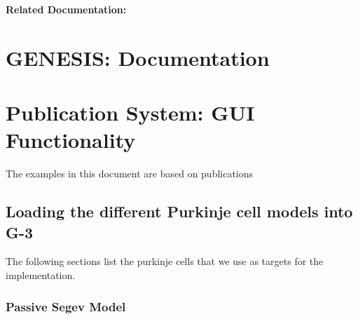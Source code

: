 \documentclass[12pt]{article}
\begin{document}
{\bf Related Documentation:}

\section*{GENESIS: Documentation}

\section{Publication System: GUI Functionality}






The examples in this document are based on publications
\cite{deschutter94:_purkin_i}\cite{deschutter94:_purkin_ii}\cite{schutter94:_simul_purkin}\cite{Rapp-P:1994qf}

\subsection{Loading the different Purkinje cell models into G-3}

The following sections list the purkinje cells that we use as targets
for the implementation.

\subsubsection{Passive Segev Model}
\end{document}
